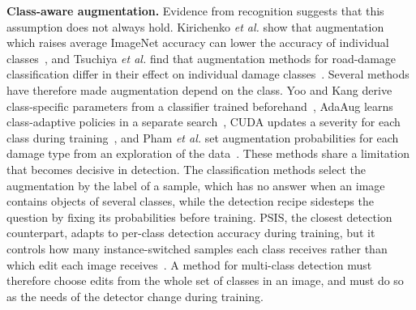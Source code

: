 \documentclass[conference]{IEEEtran}
\begin{document}
\noindent\textbf{Class-aware augmentation.} Evidence from recognition suggests that this assumption does not always hold. Kirichenko \emph{et al.} show that augmentation which raises average ImageNet accuracy can lower the accuracy of individual classes~\cite{kirichenko2023}, and Tsuchiya \emph{et al.} find that augmentation methods for road-damage classification differ in their effect on individual damage classes~\cite{tsuchiya2019}. Several methods have therefore made augmentation depend on the class. Yoo and Kang derive class-specific parameters from a classifier trained beforehand~\cite{yoo2023}, AdaAug learns class-adaptive policies in a separate search~\cite{cheung2022adaaug}, CUDA updates a severity for each class during training~\cite{ahn2023cuda}, and Pham \emph{et al.} set augmentation probabilities for each damage type from an exploration of the data~\cite{rdd_detectron2}. These methods share a limitation that becomes decisive in detection. The classification methods select the augmentation by the label of a sample, which has no answer when an image contains objects of several classes, while the detection recipe sidesteps the question by fixing its probabilities before training. PSIS, the closest detection counterpart, adapts to per-class detection accuracy during training, but it controls how many instance-switched samples each class receives rather than which edit each image receives~\cite{wang2019psis}. A method for multi-class detection must therefore choose edits from the whole set of classes in an image, and must do so as the needs of the detector change during training.
\end{document}
